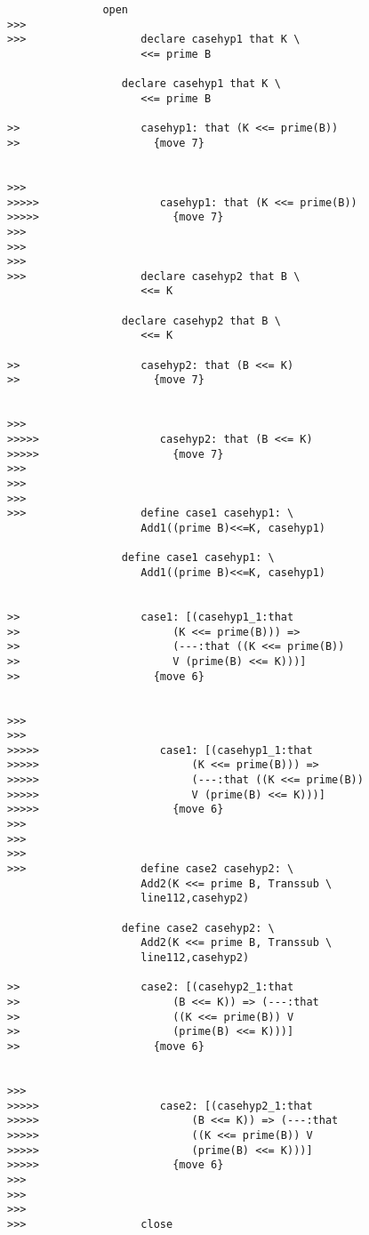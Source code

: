 \documentclass[12pt]{article}
\begin{document}
\begin{verbatim}
               open
>>>
>>>                  declare casehyp1 that K \
                     <<= prime B

                  declare casehyp1 that K \
                     <<= prime B

>>                   casehyp1: that (K <<= prime(B))
>>                     {move 7}


>>>
>>>>>                   casehyp1: that (K <<= prime(B))
>>>>>                     {move 7}
>>>
>>>
>>>
>>>                  declare casehyp2 that B \
                     <<= K

                  declare casehyp2 that B \
                     <<= K

>>                   casehyp2: that (B <<= K)
>>                     {move 7}


>>>
>>>>>                   casehyp2: that (B <<= K)
>>>>>                     {move 7}
>>>
>>>
>>>
>>>                  define case1 casehyp1: \
                     Add1((prime B)<<=K, casehyp1)

                  define case1 casehyp1: \
                     Add1((prime B)<<=K, casehyp1)


>>                   case1: [(casehyp1_1:that
>>                        (K <<= prime(B))) =>
>>                        (---:that ((K <<= prime(B))
>>                        V (prime(B) <<= K)))]
>>                     {move 6}


>>>
>>>
>>>>>                   case1: [(casehyp1_1:that
>>>>>                        (K <<= prime(B))) =>
>>>>>                        (---:that ((K <<= prime(B))
>>>>>                        V (prime(B) <<= K)))]
>>>>>                     {move 6}
>>>
>>>
>>>
>>>                  define case2 casehyp2: \
                     Add2(K <<= prime B, Transsub \
                     line112,casehyp2)

                  define case2 casehyp2: \
                     Add2(K <<= prime B, Transsub \
                     line112,casehyp2)

>>                   case2: [(casehyp2_1:that
>>                        (B <<= K)) => (---:that
>>                        ((K <<= prime(B)) V
>>                        (prime(B) <<= K)))]
>>                     {move 6}


>>>
>>>>>                   case2: [(casehyp2_1:that
>>>>>                        (B <<= K)) => (---:that
>>>>>                        ((K <<= prime(B)) V
>>>>>                        (prime(B) <<= K)))]
>>>>>                     {move 6}
>>>
>>>
>>>
>>>                  close


\end{verbatim}
\end{document}
